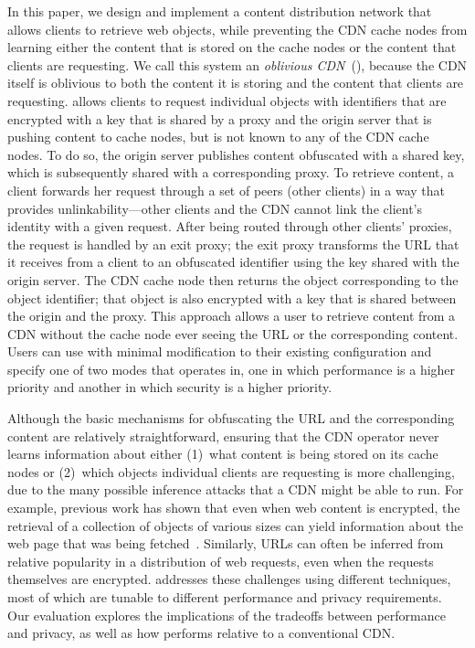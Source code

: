 In this paper, we design and implement a content distribution network that
allows clients to retrieve web objects, while preventing the CDN cache nodes
from learning either the content that is stored on the cache nodes or the
content that clients are requesting. We call this system an {\em oblivious
CDN}~(\system{}), because the CDN itself is oblivious to both the content it is
storing and the content that clients are requesting. \system{} allows clients to
request individual objects with identifiers that are encrypted with a key that
is shared by a proxy and the origin server that is pushing content to
cache nodes, but is not known to any of the CDN cache nodes.  To do so, the
origin server publishes content obfuscated with a shared key, which is subsequently 
shared with a corresponding proxy. To retrieve content, a client forwards her request 
through a set of peers (other clients) in a way that provides unlinkability---other clients 
and the CDN cannot link the client's identity with a given request.  After being routed 
through other clients' proxies, the request is handled by an exit proxy; the exit proxy 
transforms the URL that it receives
from a client to an obfuscated identifier using the key shared with the origin
server. The CDN cache node then returns the object corresponding to the object
identifier; that object is also encrypted with a key that is shared between
the origin and the proxy. This approach allows a user to retrieve content from
a CDN without the cache node ever seeing the URL or the corresponding content.
Users can use \system{} with minimal modification to their existing configuration and
specify one of two modes that \system{} operates in, one in which performance is a higher 
priority and another in which security is a higher priority.

Although the basic mechanisms for obfuscating the URL and the corresponding
content are relatively straightforward, ensuring that the CDN operator never
learns information about either (1)~what content is being stored on its cache
nodes or (2)~which objects individual clients are requesting is more
challenging, due to the many possible inference attacks that a CDN might be
able to run. For example, previous work has shown that even when web content
is encrypted, the retrieval of a collection of objects of various sizes can
yield information about the web page that was being fetched~\cite{panchenko2016website,
cai2012touching}. Similarly, URLs
can often be inferred from relative popularity in a distribution of web
requests, even when the requests themselves are encrypted. \system{} addresses
these challenges using different techniques, most of which are tunable to different 
performance and privacy requirements.  Our evaluation explores the implications of 
the tradeoffs between performance and privacy, as
well as how \system{} performs relative to a conventional CDN.

